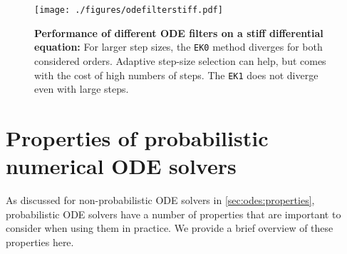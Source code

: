 \documentclass{mimosis}
\begin{document}
\begin{figure}[t]
\centering
\texttt{[image: ./figures/odefilterstiff.pdf]}
\caption{\label{fig:odefilterstiff}\textbf{Performance of different ODE filters on a stiff differential equation:} For larger step sizes, the \texttt{EK0} method diverges for both considered orders. Adaptive step-size selection can help, but comes with the cost of high numbers of steps. The \texttt{EK1} does not diverge even with large steps.}
\end{figure}
\section{Properties of probabilistic numerical ODE solvers}
\label{sec:orgb225373}
\label{sec:ode-filters:properties}
As discussed for non-probabilistic ODE solvers in
\cref{sec:odes:properties},
probabilistic ODE solvers have a number of properties that are important to consider when using them in practice.
We provide a brief overview of these properties here.
\end{document}
